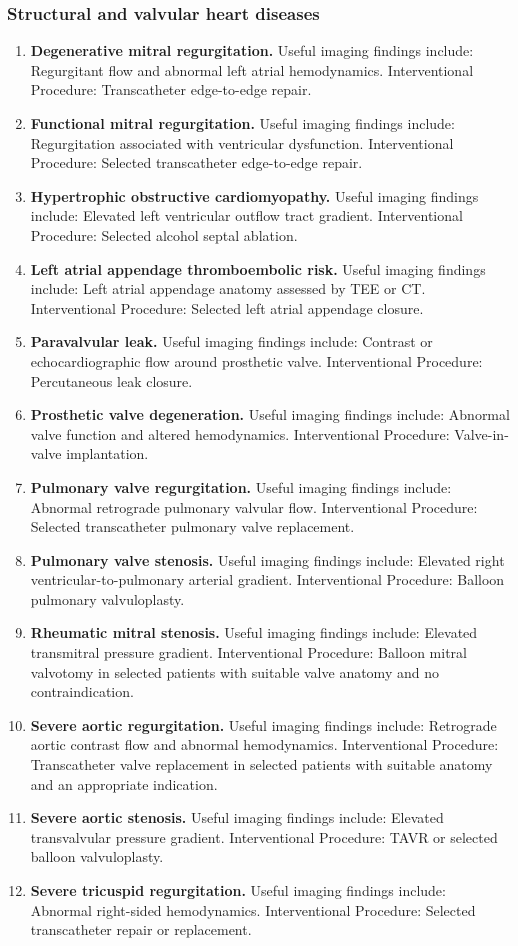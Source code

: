 \subsubsection{Structural and valvular heart diseases}
\begin{enumerate}[leftmargin=*,itemsep=0.45em,topsep=0.4em]
\item \textbf{Degenerative mitral regurgitation.} Useful imaging findings include: Regurgitant flow and abnormal left atrial hemodynamics. Interventional Procedure: Transcatheter edge-to-edge repair.
\item \textbf{Functional mitral regurgitation.} Useful imaging findings include: Regurgitation associated with ventricular dysfunction. Interventional Procedure: Selected transcatheter edge-to-edge repair.
\item \textbf{Hypertrophic obstructive cardiomyopathy.} Useful imaging findings include: Elevated left ventricular outflow tract gradient. Interventional Procedure: Selected alcohol septal ablation.
\item \textbf{Left atrial appendage thromboembolic risk.} Useful imaging findings include: Left atrial appendage anatomy assessed by TEE or CT. Interventional Procedure: Selected left atrial appendage closure.
\item \textbf{Paravalvular leak.} Useful imaging findings include: Contrast or echocardiographic flow around prosthetic valve. Interventional Procedure: Percutaneous leak closure.
\item \textbf{Prosthetic valve degeneration.} Useful imaging findings include: Abnormal valve function and altered hemodynamics. Interventional Procedure: Valve-in-valve implantation.
\item \textbf{Pulmonary valve regurgitation.} Useful imaging findings include: Abnormal retrograde pulmonary valvular flow. Interventional Procedure: Selected transcatheter pulmonary valve replacement.
\item \textbf{Pulmonary valve stenosis.} Useful imaging findings include: Elevated right ventricular-to-pulmonary arterial gradient. Interventional Procedure: Balloon pulmonary valvuloplasty.
\item \textbf{Rheumatic mitral stenosis.} Useful imaging findings include: Elevated transmitral pressure gradient. Interventional Procedure: Balloon mitral valvotomy in selected patients with suitable valve anatomy and no contraindication.
\item \textbf{Severe aortic regurgitation.} Useful imaging findings include: Retrograde aortic contrast flow and abnormal hemodynamics. Interventional Procedure: Transcatheter valve replacement in selected patients with suitable anatomy and an appropriate indication.
\item \textbf{Severe aortic stenosis.} Useful imaging findings include: Elevated transvalvular pressure gradient. Interventional Procedure: TAVR or selected balloon valvuloplasty.
\item \textbf{Severe tricuspid regurgitation.} Useful imaging findings include: Abnormal right-sided hemodynamics. Interventional Procedure: Selected transcatheter repair or replacement.
\end{enumerate}

